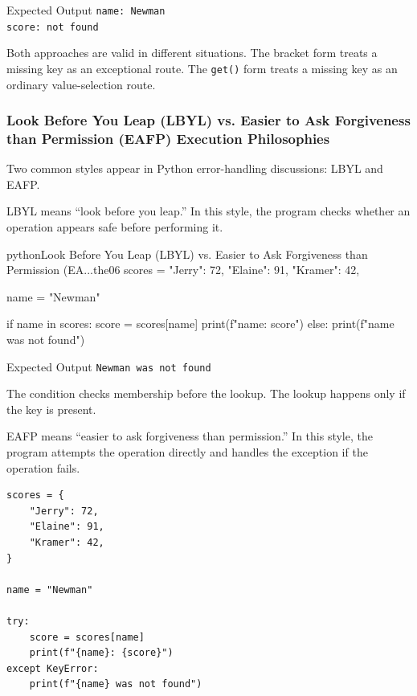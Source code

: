 \begin{iobox}{Expected Output}
\texttt{name: Newman} \\
\texttt{score: not found} \\
\end{iobox}


Both approaches are valid in different situations. The bracket form treats a missing key as an exceptional route. The \texttt{get()} form treats a missing key as an ordinary value-selection route.

\subsubsection{Look Before You Leap (LBYL) vs. Easier to Ask Forgiveness than Permission (EAFP) Execution Philosophies}

Two common styles appear in Python error-handling discussions: LBYL and EAFP.

LBYL means ``look before you leap.'' In this style, the program checks whether an operation appears safe before performing it.

\begin{codebox}[]{python}{Look Before You Leap (LBYL) vs. Easier to Ask Forgiveness than Permission (EA...}{the06}
scores = {
    "Jerry": 72,
    "Elaine": 91,
    "Kramer": 42,
}

name = "Newman"

if name in scores:
    score = scores[name]
    print(f"{name}: {score}")
else:
    print(f"{name} was not found")
\end{codebox}


\begin{iobox}{Expected Output}
\texttt{Newman was not found} \\
\end{iobox}


The condition checks membership before the lookup. The lookup happens only if the key is present.

EAFP means ``easier to ask forgiveness than permission.'' In this style, the program attempts the operation directly and handles the exception if the operation fails.

\begin{verbatim}
scores = {
    "Jerry": 72,
    "Elaine": 91,
    "Kramer": 42,
}

name = "Newman"

try:
    score = scores[name]
    print(f"{name}: {score}")
except KeyError:
    print(f"{name} was not found")
\end{verbatim}


